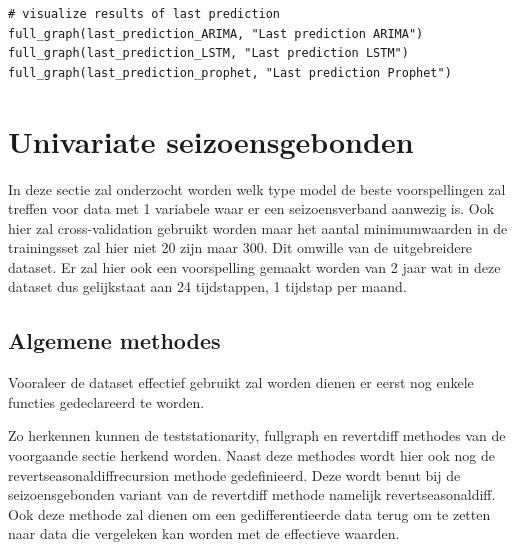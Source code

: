 \begin{verbatim}
# visualize results of last prediction
full_graph(last_prediction_ARIMA, "Last prediction ARIMA")
full_graph(last_prediction_LSTM, "Last prediction LSTM")
full_graph(last_prediction_prophet, "Last prediction Prophet")
\end{verbatim}

\clearpage

\section{Univariate seizoensgebonden}

In deze sectie zal onderzocht worden welk type model de beste voorspellingen zal treffen voor data met 1 variabele waar er een seizoensverband aanwezig is. Ook hier zal cross-validation gebruikt worden maar het aantal minimumwaarden in de trainingsset zal hier niet 20 zijn maar 300. Dit omwille van de uitgebreidere dataset. Er zal hier ook een voorspelling gemaakt worden van 2 jaar wat in deze dataset dus gelijkstaat aan 24 tijdstappen, 1 tijdstap per maand.

\subsection{Algemene methodes}

Vooraleer de dataset effectief gebruikt zal worden dienen er eerst nog enkele functies gedeclareerd te worden.

Zo herkennen kunnen de test\textunderscore stationarity, full\textunderscore graph en  revert\textunderscore diff methodes van de voorgaande sectie herkend worden. Naast deze methodes wordt hier ook nog de revert\textunderscore seasonal\textunderscore diff\textunderscore recursion methode gedefinieerd. Deze wordt benut bij de seizoensgebonden variant van de revert\textunderscore diff methode namelijk revert\textunderscore seasonal\textunderscore diff. Ook deze methode zal dienen om een gedifferentieerde data terug om te zetten naar data die vergeleken kan worden met de effectieve waarden.


